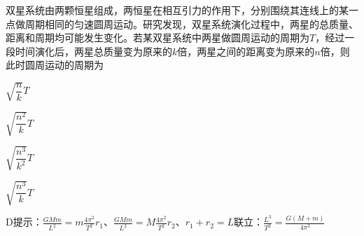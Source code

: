 双星系统由两颗恒星组成，两恒星在相互引力的作用下，分别围绕其连线上的某一点做周期相同的匀速圆周运动。研究发现，双星系统演化过程中，两星的总质量、距离和周期均可能发生变化。若某双星系统中两星做圆周运动的周期为\(T\)，经过一段时间演化后，两星总质量变为原来的\(k\)倍，两星之间的距离变为原来的\(n\)倍，则此时圆周运动的周期为\paren[]
\begin{choices}
	\item \(\sqrt{\dfrac{n}{k}}T\)
	\item \(\sqrt{\dfrac{n^2}{k}}T\)
	\item \(\sqrt{\dfrac{n^3}{k^2}}T\)
	\item \(\sqrt{\dfrac{n^3}{k}}T\)
\end{choices}
\begin{answer}
	D\qquad 提示：\(\frac{GMm}{L^2} = m \frac{4\pi^2}{T^2}r_1\)、\(\frac{GMm}{L^2} = M \frac{4\pi^2}{T^2}r_2\)、\(r_1 + r_2 = L\)联立：\(\frac{L^3}{T^2} = \frac{G(M + m)}{4\pi^2} \)
\end{answer}